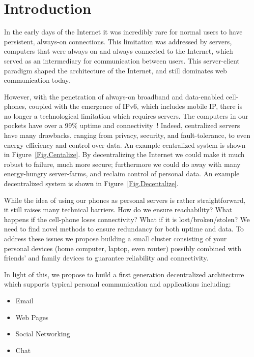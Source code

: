\section{Introduction}
\label{Introduction}
In the early days of the Internet it was incredibly rare for normal users to have persistent, always-on connections.  
This limitation was addressed by servers, computers that were always on and always connected to the Internet, which served as an intermediary for communication between users.  
This server-client paradigm shaped the architecture of the Internet, and still dominates web communication today. 

However, with the penetration of always-on broadband and data-enabled cell-phones, coupled with the emergence of IPv6, which includes mobile IP, there is no longer a technological limitation which requires servers.  
The computers in our pockets have over a 99\% uptime and connectivity~\cite{rahmati2007context}!  
Indeed, centralized servers have many drawbacks, ranging from privacy, security, and fault-tolerance, to even energy-efficiency and control over data. 
An example centralized system is shown in Figure~\ref{Fig.Centalize}.
By decentralizing the Internet we could make it much robust to failure, much more secure; furthermore we could do away with many energy-hungry server-farms, and reclaim control of personal data. 
An example decentralized system is shown in Figure~\ref{Fig.Decentalize}.

While the idea of using our phones as personal servers is rather straightforward, it still raises many technical barriers.  
How do we ensure reachability?  
What happens if the cell-phone loses connectivity?  
What if it is lost/broken/stolen?  We need to find novel methods to ensure redundancy for both uptime and data.  
To address these issues we propose building a small cluster consisting of your personal devices (home computer, laptop, even router) possibly combined with friends’ and family devices to guarantee reliability and connectivity.

In light of this, we propose to build a first generation decentralized architecture which supports typical personal communication and applications including:
\begin{itemize}
  \item Email
  \item Web Pages
  \item Social Networking
  \item Chat
\end{itemize}

